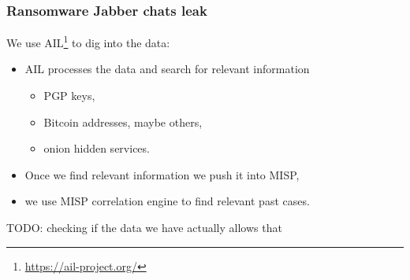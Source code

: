 \begin{frame}
    \frametitle{Ransomware Jabber chats leak}
    We use AIL\footnote{\url{https://ail-project.org/}} to dig into the data:
    \begin{itemize}
        \item AIL processes the data and search for relevant information
        \begin{itemize}
        \item PGP keys,
        \item Bitcoin addresses, maybe others,
        \item onion hidden services.
        \end{itemize}
    \item Once we find relevant information we push it into MISP,
    \item we use MISP correlation engine to find relevant past cases.
    \end{itemize}
    TODO: checking if the data we have actually allows that
\end{frame}

